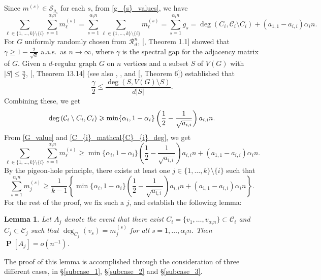 \documentclass[11pt,reqno]{amsart}
\newtheorem{lemma}[theorem]{Lemma}
\theoremstyle{definition}
\theoremstyle{remark}
\theoremstyle{conjecture}
\DeclareMathOperator{\Prob}{\mathbf{P}}
\begin{document}
Since $m^{(s)} \in \mathcal{S}_{g_{s}}$ for each $s$, from \eqref{g_{s}_values}, we have
\begin{equation}\label{G_value}
\sum_{\ell \in \{1, \ldots, k\} \setminus \{i\}} \sum_{s=1}^{\alpha_{i} n} m^{(s)}_{\ell} = \sum_{s=1}^{\alpha_{i} n} \sum_{\ell \in \{1, \ldots, k\} \setminus \{i\}} m^{(s)}_{\ell} = \sum_{s=1}^{\alpha_{i} n} g_{s} = \deg(C_{i}, \mathcal{C}_{i} \setminus C_{i}) + (a_{1,1} - a_{i,i})\alpha_{i} n. 
\end{equation}
For $G$ uniformly randomly chosen from $\mathcal{R}^{n}_{d}$, [\cite{10}, Theorem 1.1] showed that $\gamma \geqslant 1 - \frac{2}{\sqrt{d}}$ a.a.s.\ as $n \rightarrow \infty$, where $\gamma$ is the spectral gap for the adjacency matrix of $G$. Given a $d$-regular graph $G$ on $n$ vertices and a subset $S$ of $V(G)$ with $|S| \leqslant \frac{n}{2}$, [\cite{06}, Theorem 13.14] (see also \cite{11}, \cite{12}, and [\cite{05}, Theorem 6]) established that
\begin{equation}
\frac{\gamma}{2} \leqslant \frac{\deg(S, V(G) \setminus S)}{d|S|}. \nonumber
\end{equation}
Combining these, we get 
\begin{equation}\label{C_{i}_mathcal{C}_{i}_deg}
\deg\left(\mathcal{C}_{i} \setminus C_{i}, C_{i}\right) \geqslant \min\{\alpha_{i}, 1 - \alpha_{i}\} \left(\frac{1}{2} - \frac{1}{\sqrt{a_{i,i}}}\right) a_{i,i} n.
\end{equation}
From \eqref{G_value} and \eqref{C_{i}_mathcal{C}_{i}_deg}, we get
\begin{equation}
\sum_{\ell \in \{1, \ldots, k\} \setminus \{i\}} \sum_{s=1}^{\alpha_{i} n} m^{(s)}_{\ell} \geqslant \min\{\alpha_{i}, 1 - \alpha_{i}\} \left(\frac{1}{2} - \frac{1}{\sqrt{a_{i,i}}}\right) a_{i,i} n + (a_{1,1} - a_{i,i})\alpha_{i} n. \nonumber
\end{equation}
By the pigeon-hole principle, there exists at least one $j \in \{1, \ldots, k\} \setminus \{i\}$ such that
\begin{equation}\label{choice_of_j}
\sum_{s=1}^{\alpha_{i} n} m^{(s)}_{j} \geqslant \frac{1}{k-1}\left\{\min\{\alpha_{i}, 1 - \alpha_{i}\} \left(\frac{1}{2} - \frac{1}{\sqrt{a_{i,i}}}\right) a_{i,i} n + (a_{1,1} - a_{i,i})\alpha_{i} n\right\}.
\end{equation}
For the rest of the proof, we fix such a $j$, and establish the following lemma:
\begin{lemma}\label{main_step_lemma}
Let $A_{j}$ denote the event that there exist $C_{i} = \{v_{1}, \ldots, v_{\alpha_{i} n}\} \subset \mathcal{C}_{i}$ and $C_{j} \subset \mathcal{C}_{j}$ such that $\deg_{C_{j}}(v_{s}) = m^{(s)}_{j}$ for all $s = 1, \ldots, \alpha_{i} n$. Then $\Prob[A_{j}] = o(n^{-1})$.
\end{lemma} 
The proof of this lemma is accomplished through the consideration of three different cases, in \S\ref{subcase_1}, \S\ref{subcase_2} and \S\ref{subcase_3}. 
\end{document}
